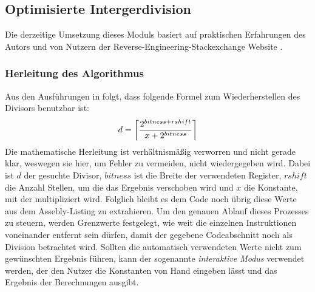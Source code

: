 \documentclass[11pt]{article}
\DeclarePairedDelimiter\ceil{\lceil}{\rceil}
\begin{document}
\subsection{Optimisierte Intergerdivision} Die derzeitige Umsetzung dieses Moduls basiert auf
praktischen Erfahrungen des Autors und von Nutzern der Reverse-Engineering-Stackexchange
Website \cite{stackexchange:4}.

\subsubsection{Herleitung des Algorithmus}
Aus den Ausführungen in \cite{stackexchange:4} folgt, dass folgende Formel zum Wiederherstellen
des Divisors benutzbar ist:
\begin{equation*}
	d = \ceil*{\frac{2^{bitness + rshift}}{x + 2^{bitness}}}
\end{equation*}
Die mathematische Herleitung ist verhältnismäßig verworren und nicht gerade klar, weswegen sie hier,
um Fehler zu vermeiden, nicht wiedergegeben wird. Dabei ist $d$ der gesuchte Divisor, $bitness$ ist
die Breite der verwendeten Register, $rshift$ die Anzahl Stellen, um die das Ergebnis verschoben wird
und $x$ die Konstante, mit der multipliziert wird.
Folglich bleibt es dem Code noch übrig diese Werte aus dem Assebly-Listing zu extrahieren. Um den
genauen Ablauf dieses Prozesses zu steuern, werden Grenzwerte festgelegt, wie weit die einzelnen
Instruktionen voneinander entfernt sein dürfen, damit der gegebene Codeabschnitt noch als Division
betrachtet wird. Sollten die automatisch verwendeten Werte nicht zum gewünschten Ergebnis führen,
kann der sogenannte \textit{interaktive Modus} verwendet werden, der den Nutzer die Konstanten von
Hand eingeben lässt und das Ergebnis der Berechnungen ausgibt. 
\end{document}
